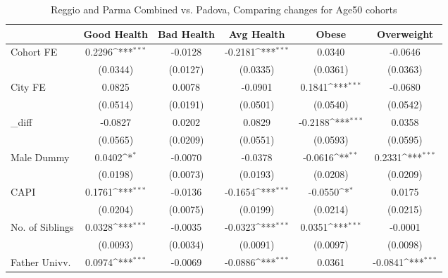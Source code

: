 \begin{table}[htbp]\centering
\def\sym#1{\ifmmode^{#1}\else\(^{#1}\)\fi}
\caption{Reggio and Parma Combined vs. Padova, Comparing changes for Age50 cohorts}
\begin{tabular}{l*{5}{c}}
\toprule
            &\multicolumn{1}{c}{Good Health}&\multicolumn{1}{c}{Bad Health}&\multicolumn{1}{c}{Avg Health}&\multicolumn{1}{c}{Obese}&\multicolumn{1}{c}{Overweight}\\
\midrule
Cohort FE   &      0.2296\sym{***}&     -0.0128         &     -0.2181\sym{***}&      0.0340         &     -0.0646         \\
            &    (0.0344)         &    (0.0127)         &    (0.0335)         &    (0.0361)         &    (0.0363)         \\
\addlinespace
City FE     &      0.0825         &      0.0078         &     -0.0901         &      0.1841\sym{***}&     -0.0680         \\
            &    (0.0514)         &    (0.0191)         &    (0.0501)         &    (0.0540)         &    (0.0542)         \\
\addlinespace
\_diff       &     -0.0827         &      0.0202         &      0.0829         &     -0.2188\sym{***}&      0.0358         \\
            &    (0.0565)         &    (0.0209)         &    (0.0551)         &    (0.0593)         &    (0.0595)         \\
\addlinespace
Male Dummy  &      0.0402\sym{*}  &     -0.0070         &     -0.0378         &     -0.0616\sym{**} &      0.2331\sym{***}\\
            &    (0.0198)         &    (0.0073)         &    (0.0193)         &    (0.0208)         &    (0.0209)         \\
\addlinespace
CAPI        &      0.1761\sym{***}&     -0.0136         &     -0.1654\sym{***}&     -0.0550\sym{*}  &      0.0175         \\
            &    (0.0204)         &    (0.0075)         &    (0.0199)         &    (0.0214)         &    (0.0215)         \\
\addlinespace
No. of Siblings&      0.0328\sym{***}&     -0.0035         &     -0.0323\sym{***}&      0.0351\sym{***}&     -0.0001         \\
            &    (0.0093)         &    (0.0034)         &    (0.0091)         &    (0.0097)         &    (0.0098)         \\
\addlinespace
Father Univv.&      0.0974\sym{***}&     -0.0069         &     -0.0886\sym{***}&      0.0361         &     -0.0841\sym{***}\\

\end{tabular}
\end{table}
